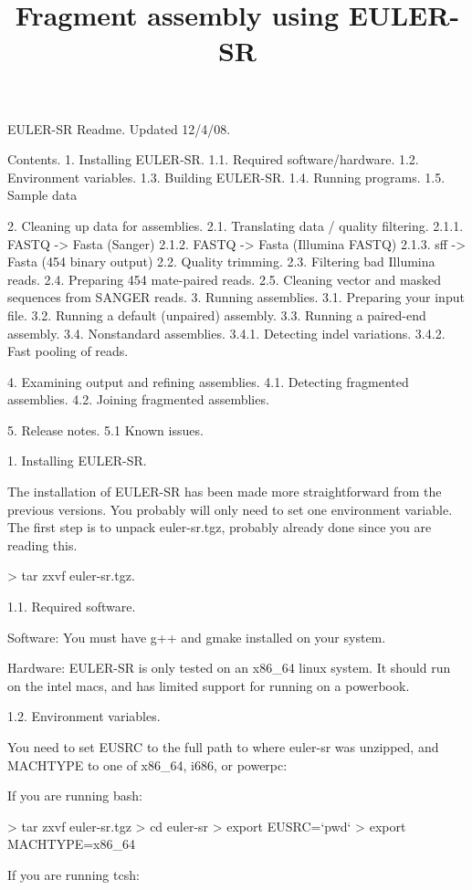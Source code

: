 \documentclass{article}[12pt]
\begin{document}
\title{Fragment assembly using EULER-SR}

EULER-SR Readme.  Updated 12/4/08.

Contents.
  1.  Installing EULER-SR.
    1.1.  Required software/hardware.
		1.2.  Environment variables.
		1.3.  Building EULER-SR.
		1.4.  Running programs.
    1.5.  Sample data

  2.  Cleaning up data for assemblies.
	  2.1.  Translating data / quality filtering.
			2.1.1.  FASTQ -> Fasta (Sanger)
			2.1.2.  FASTQ -> Fasta (Illumina FASTQ)
			2.1.3.  sff -> Fasta (454 binary output)
    2.2.  Quality trimming.
    2.3.  Filtering bad Illumina reads.
    2.4.  Preparing 454 mate-paired reads.
		2.5.  Cleaning vector and masked sequences from SANGER
		      reads.
  3. Running assemblies.
	  3.1. Preparing your input file.
	  3.2. Running a default (unpaired) assembly.
		3.3. Running a paired-end assembly.
		3.4. Nonstandard assemblies.
		  3.4.1.  Detecting indel variations.
			3.4.2.  Fast pooling of reads. 

  4. Examining output and refining assemblies.
    4.1. Detecting fragmented assemblies.
    4.2. Joining fragmented assemblies.

  5.  Release notes.
	  5.1 Known issues.
	

1.  Installing EULER-SR.

The installation of EULER-SR has been made more straightforward from
the previous versions. You probably will only need to set one
environment variable.  The first step is to unpack euler-sr.tgz,
probably already done since you are reading this.

> tar zxvf euler-sr.tgz.

1.1. Required software.
  
  Software: You must have g++ and gmake installed on your system.  

  Hardware: EULER-SR is only tested on an x86\_64 linux system.  It
  should run on the intel macs, and has limited support for running on
  a powerbook.

1.2.  Environment variables.

You need to set EUSRC to the full path to where euler-sr was unzipped,
and MACHTYPE to one of x86\_64, i686, or powerpc:

If you are running bash:

> tar zxvf euler-sr.tgz
> cd euler-sr
> export  EUSRC=`pwd`
> export  MACHTYPE=x86\_64

If you are running tcsh:
\end{document}
